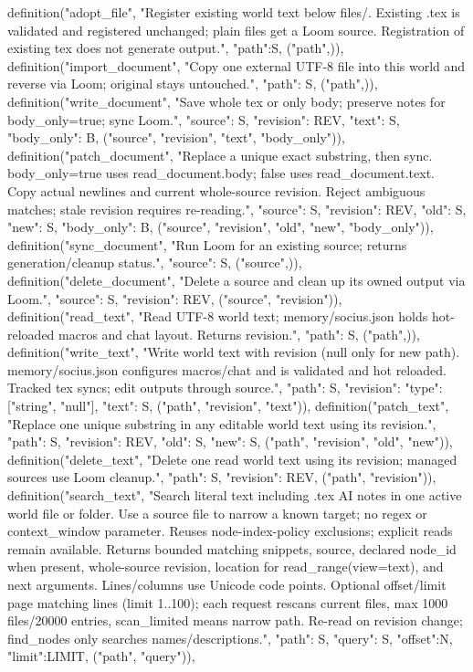     definition("adopt_file", "Register existing world text below files/. Existing .tex is validated and registered unchanged; plain files get a Loom source. Registration of existing tex does not generate output.", {"path":S}, ("path",)),
    definition("import_document", "Copy one external UTF-8 file into this world and reverse via Loom; original stays untouched.", {"path": S}, ("path",)),
    definition("write_document", "Save whole tex or only body; preserve notes for body_only=true; sync Loom.", {"source": S, "revision": REV, "text": S, "body_only": B}, ("source", "revision", "text", "body_only")),
    definition("patch_document", "Replace a unique exact substring, then sync. body_only=true uses read_document.body; false uses read_document.text. Copy actual newlines and current whole-source revision. Reject ambiguous matches; stale revision requires re-reading.", {"source": S, "revision": REV, "old": S, "new": S, "body_only": B}, ("source", "revision", "old", "new", "body_only")),
    definition("sync_document", "Run Loom for an existing source; returns generation/cleanup status.", {"source": S}, ("source",)),
    definition("delete_document", "Delete a source and clean up its owned output via Loom.", {"source": S, "revision": REV}, ("source", "revision")),
    definition("read_text", "Read UTF-8 world text; memory/socius.json holds hot-reloaded macros and chat layout. Returns revision.", {"path": S}, ("path",)),
    definition("write_text", "Write world text with revision (null only for new path). memory/socius.json configures macros/chat and is validated and hot reloaded. Tracked tex syncs; edit outputs through source.", {"path": S, "revision": {"type": ["string", "null"]}, "text": S}, ("path", "revision", "text")),
    definition("patch_text", "Replace one unique substring in any editable world text using its revision.", {"path": S, "revision": REV, "old": S, "new": S}, ("path", "revision", "old", "new")),
    definition("delete_text", "Delete one read world text using its revision; managed sources use Loom cleanup.", {"path": S, "revision": REV}, ("path", "revision")),
    definition("search_text", "Search literal text including .tex AI notes in one active world file or folder. Use a source file to narrow a known target; no regex or context_window parameter. Reuses node-index-policy exclusions; explicit reads remain available. Returns bounded matching snippets, source, declared node_id when present, whole-source revision, location for read_range(view=text), and next arguments. Lines/columns use Unicode code points. Optional offset/limit page matching lines (limit 1..100); each request rescans current files, max 1000 files/20000 entries, scan_limited means narrow path. Re-read on revision change; find_nodes only searches names/descriptions.", {"path": S, "query": S, "offset":N, "limit":LIMIT}, ("path", "query")),
